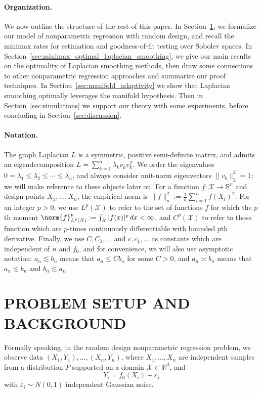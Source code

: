 \documentclass[twoside]{article}
\newcommand{\Reals}{\mathbb{R}}
\newcommand{\1}{\mathbf{1}}
\newcommand{\Xset}{\mathcal{X}}
\newcommand{\Leb}{L}
\theoremstyle{definition}
\theoremstyle{remark}
\begin{document}
\paragraph{Organization.}
We now outline the structure of the rest of this paper. In Section~\ref{sec:problem_setup_and_background}, we formalize our model of nonparametric regression with random design, and recall the minimax rates for estimation and goodness-of-fit testing over Sobolev spaces. In Section~\ref{sec:minimax_optimal_laplacian_smoothing}, we give our main results on the optimality of Laplacian smoothing methods, then draw some connections to other nonparametric regression approaches and summarize our proof techniques. In Section~\ref{sec:manifold_adaptivity} we show that Laplacian smoothing optimally leverages the manifold hypothesis. Then in Section~\ref{sec:simulations} we support our theory with some experiments, before concluding in Section~\ref{sec:discussion}.


\paragraph{Notation.}
The graph Laplacian $L$ is a symmetric, positive semi-definite matrix, and admits an eigendecomposition $L = \sum_{k = 1}^{n} \lambda_k v_k v_k^T$. We order the eigenvalues $0 = \lambda_1 \leq \lambda_2 \leq \cdots \leq \lambda_n$, and always consider unit-norm eigenvectors $\|v_k\|_2^2 = 1$; we will make reference to these objects later on. For a function $f: \Xset \to \Reals^n$ and design points $X_1,\ldots,X_n$, the empirical norm is $\|f\|_n^2 := \frac{1}{n}\sum_{i = 1}^{n} f(X_i)^2$. For an integer $p > 0$, we use $\Leb^p(\Xset)$ to refer to the set of functions $f$ for which the $p$th moment $\norm{f}_{\Leb^p(\Xset)}^p := \int_{\Xset} |f(x)|^p \,dx < \infty$, and $C^p(\Xset)$ to refer to those function which are $p$-times continuously differentiable with bounded $p$th derivative. Finally, we use $C,C_1,\ldots$ and $c,c_1,\ldots$ as constants which are independent of $n$ and $f_0$, and for convenience, we will also use asymptotic notation: $a_n \lesssim b_n$ means that $a_n \leq Cb_n$ for some $C > 0$, and $a_n \asymp b_n$ means that $a_n \lesssim b_n$ and $b_n \lesssim a_n$.

\section{PROBLEM SETUP AND BACKGROUND}
\label{sec:problem_setup_and_background}
Formally speaking, in the random design nonparametric regression problem, we observe data $(X_1,Y_1),\ldots,(X_n,Y_n)$, where $X_1,\ldots,X_n$ are independent samples from a distribution $P$ supported on a domain $\Xset \subset \Reals^d$, and 
\begin{equation}
\label{eqn:random_design_regression}
Y_i = f_0(X_i) + \varepsilon_i
\end{equation}
with $\varepsilon_i \sim N(0,1)$ independent Gaussian noise. 
\end{document}

